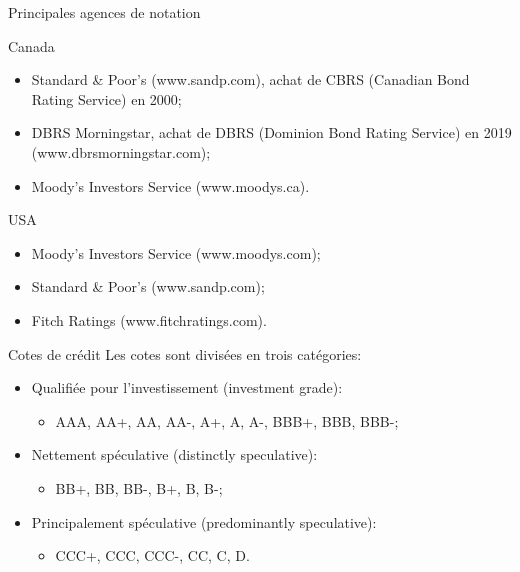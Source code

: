 \documentclass{beamer}
\begin{document}
\begin{frame}{Principales agences de notation}
\begin{block}{Canada}
\begin{itemize}
\item Standard & Poor’s (www.sandp.com), achat de CBRS (Canadian Bond Rating Service) en 2000;
\item DBRS Morningstar, achat de DBRS (Dominion Bond Rating Service) en 2019 (www.dbrsmorningstar.com);
\item Moody’s Investors Service (www.moodys.ca).
\end{itemize}
\end{block}
\begin{block}{USA}
\begin{itemize}
\item Moody’s Investors Service (www.moodys.com);
\item Standard & Poor’s (www.sandp.com);
\item Fitch Ratings (www.fitchratings.com).
\end{itemize}
\end{block}
\end{frame}

\begin{frame}{Cotes de crédit}
Les cotes sont divisées en trois catégories:  
\begin{itemize}
\item Qualifiée pour l’investissement (investment grade): 
\begin{itemize}
\item AAA, AA+, AA, AA-, A+, A, A-, BBB+, BBB, BBB-;
\end{itemize}
\item Nettement spéculative (distinctly speculative):
\begin{itemize} 
\item BB+, BB, BB-, B+, B, B-;
\end{itemize}
\item Principalement spéculative (predominantly speculative): 
\begin{itemize} 
\item CCC+, CCC, CCC-, CC, C, D.
\end{itemize}
\end{itemize}
\end{frame}
\end{document}
